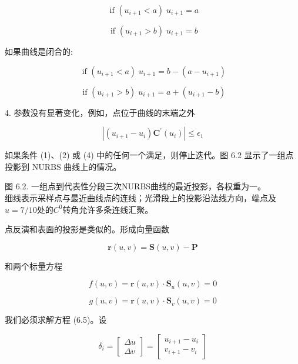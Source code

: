 \documentclass[../main.tex]{subfiles}
\begin{document}
\[
\text{ if }\left( {{u}_{i + 1} < a}\right) \;{u}_{i + 1} = a
\]

\[
\text{ if }\left( {{u}_{i + 1} > b}\right) \;{u}_{i + 1} = b
\]

如果曲线是闭合的:

\[
\text{ if }\left( {{u}_{i + 1} < a}\right) \;{u}_{i + 1} = b - \left( {a - {u}_{i + 1}}\right)
\]

\[
\text{ if }\left( {{u}_{i + 1} > b}\right) \;{u}_{i + 1} = a + \left( {{u}_{i + 1} - b}\right)
\]

4. 参数没有显著变化，例如，点位于曲线的末端之外

\[
\left| {\left( {{u}_{i + 1} - {u}_{i}}\right) {\mathbf{C}}^{\prime }\left( {u}_{i}\right) }\right|  \leq  {\epsilon }_{1}
\]

如果条件 (1)、(2) 或 (4) 中的任何一个满足，则停止迭代。图 6.2 显示了一组点投影到 NURBS 曲线上的情况。

\begin{center}
\begin{minipage}{22.4cm}
\vspace*{.6\baselineskip}
\centering
{}
\par\smallskip
图 6.2. 一组点到代表性分段三次NURBS曲线的最近投影，各权重为一。\\
细线表示采样点与最近曲线点的连线；光滑段上的投影沿法线方向，端点及$u=7/10$处的$C^0$转角允许多条连线汇聚。
\end{minipage}
\end{center}

点反演和表面的投影是类似的。形成向量函数

\[
\mathbf{r}\left( {u,v}\right)  = \mathbf{S}\left( {u,v}\right)  - \mathbf{P}
\]

和两个标量方程

\[
f\left( {u,v}\right)  = \mathbf{r}\left( {u,v}\right)  \cdot  {\mathbf{S}}_{u}\left( {u,v}\right)  = 0
\]

\[
g\left( {u,v}\right)  = \mathbf{r}\left( {u,v}\right)  \cdot  {\mathbf{S}}_{v}\left( {u,v}\right)  = 0 \tag{6.5}
\]



我们必须求解方程 (6.5)。设

\[
{\delta }_{i} = \left\lbrack  \begin{matrix} {\Delta u} \\  {\Delta v} \end{matrix}\right\rbrack   = \left\lbrack  \begin{matrix} {u}_{i + 1} - {u}_{i} \\  {v}_{i + 1} - {v}_{i} \end{matrix}\right\rbrack
\]
\end{document}
